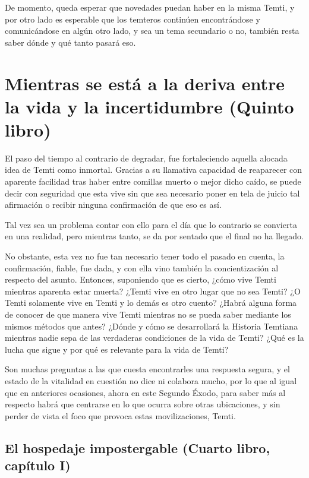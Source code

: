 \documentclass[
  spanish,
]{book}
\begin{document}
De momento, queda esperar que novedades puedan haber en la misma Temti, y por otro lado es esperable que los temteros continúen encontrándose y comunicándose en algún otro lado, y sea un tema secundario o no, también resta saber dónde y qué tanto pasará eso.

\hypertarget{mientras-se-estuxe1-a-la-deriva-entre-la-vida-y-la-incertidumbre-quinto-libro}{%
\chapter{Mientras se está a la deriva entre la vida y la incertidumbre (Quinto libro)}\label{mientras-se-estuxe1-a-la-deriva-entre-la-vida-y-la-incertidumbre-quinto-libro}}

El paso del tiempo al contrario de degradar, fue fortaleciendo aquella alocada idea de Temti como inmortal. Gracias a su llamativa capacidad de reaparecer con aparente facilidad tras haber entre comillas muerto o mejor dicho caído, se puede decir con seguridad que esta vive sin que sea necesario poner en tela de juicio tal afirmación o recibir ninguna confirmación de que eso es así.

Tal vez sea un problema contar con ello para el día que lo contrario se convierta en una realidad, pero mientras tanto, se da por sentado que el final no ha llegado.

No obstante, esta vez no fue tan necesario tener todo el pasado en cuenta, la confirmación, fiable, fue dada, y con ella vino también la concientización al respecto del asunto. Entonces, suponiendo que es cierto, ¿cómo vive Temti mientras aparenta estar muerta? ¿Temti vive en otro lugar que no sea Temti? ¿O Temti solamente vive en Temti y lo demás es otro cuento? ¿Habrá alguna forma de conocer de que manera vive Temti mientras no se pueda saber mediante los mismos métodos que antes? ¿Dónde y cómo se desarrollará la Historia Temtiana mientras nadie sepa de las verdaderas condiciones de la vida de Temti? ¿Qué es la lucha que sigue y por qué es relevante para la vida de Temti?

Son muchas preguntas a las que cuesta encontrarles una respuesta segura, y el estado de la vitalidad en cuestión no dice ni colabora mucho, por lo que al igual que en anteriores ocasiones, ahora en este Segundo Éxodo, para saber más al respecto habrá que centrarse en lo que ocurra sobre otras ubicaciones, y sin perder de vista el foco que provoca estas movilizaciones, Temti.

\hypertarget{el-hospedaje-impostergable-cuarto-libro-capuxedtulo-i}{%
\section{El hospedaje impostergable (Cuarto libro, capítulo I)}\label{el-hospedaje-impostergable-cuarto-libro-capuxedtulo-i}}
\end{document}
